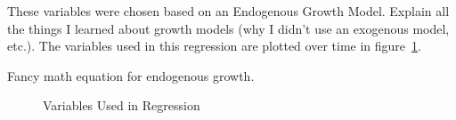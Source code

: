 These variables were chosen based on an Endogenous Growth Model.
Explain all the things I learned about growth models (why I didn't use an
exogenous model, etc.). The variables used in this regression are plotted over time
in figure~\ref{fig:variables}.

Fancy math equation for endogenous growth.

\begin{figure}[!ht]
\label{fig:variables}
\begin{center}
\caption{Variables Used in Regression}

\end{center}
\end{figure}
